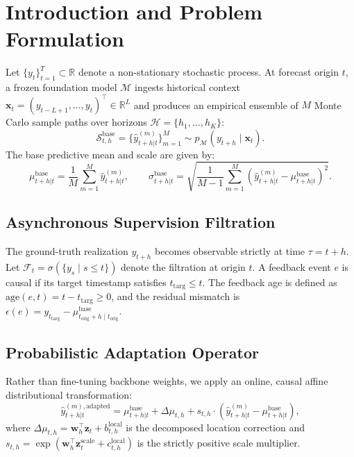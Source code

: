 \documentclass{article}
\begin{document}
\section{Introduction and Problem Formulation}
Let $\{y_t\}_{t=1}^T \subset \mathbb{R}$ denote a non-stationary stochastic process. At forecast origin $t$, a frozen foundation model $\mathcal{M}$ ingests historical context $\mathbf{x}_t = (y_{t-L+1}, \dots, y_t)^\top \in \mathbb{R}^L$ and produces an empirical ensemble of $M$ Monte Carlo sample paths over horizons $\mathcal{H} = \{h_1, \dots, h_K\}$:
\begin{equation}
\mathcal{S}_{t,h}^{\text{base}} = \{ \hat{y}_{t+h|t}^{(m)} \}_{m=1}^M \sim p_{\mathcal{M}}(y_{t+h} \mid \mathbf{x}_t).
\end{equation}
The base predictive mean and scale are given by:
\begin{equation}
\mu_{t+h|t}^{\text{base}} = \frac{1}{M}\sum_{m=1}^M \hat{y}_{t+h|t}^{(m)}, \qquad \sigma_{t+h|t}^{\text{base}} = \sqrt{\frac{1}{M-1}\sum_{m=1}^M (\hat{y}_{t+h|t}^{(m)} - \mu_{t+h|t}^{\text{base}})^2}.
\end{equation}

\subsection{Asynchronous Supervision Filtration}
The ground-truth realization $y_{t+h}$ becomes observable strictly at time $\tau = t + h$. Let $\mathcal{F}_t = \sigma(\{y_s \mid s \le t\})$ denote the filtration at origin $t$. A feedback event $e$ is causal if its target timestamp satisfies $t_{\text{targ}} \le t$. The feedback age is defined as $\text{age}(e, t) = t - t_{\text{targ}} \ge 0$, and the residual mismatch is $\epsilon(e) = y_{t_{\text{targ}}} - \mu_{t_{\text{orig}}+h \mid t_{\text{orig}}}^{\text{base}}$.

\subsection{Probabilistic Adaptation Operator}
Rather than fine-tuning backbone weights, we apply an online, causal affine distributional transformation:
\begin{equation}
\hat{y}_{t+h|t}^{(m), \text{adapted}} = \mu_{t+h|t}^{\text{base}} + \Delta \mu_{t,h} + s_{t,h} \cdot (\hat{y}_{t+h|t}^{(m)} - \mu_{t+h|t}^{\text{base}}),
\end{equation}
where $\Delta \mu_{t,h} = \mathbf{w}_h^\top \mathbf{z}_t + b_{t,h}^{\text{local}}$ is the decomposed location correction and $s_{t,h} = \exp(\mathbf{w}_h^\top \mathbf{z}_t^{\text{scale}} + c_{t,h}^{\text{local}})$ is the strictly positive scale multiplier.
\end{document}
